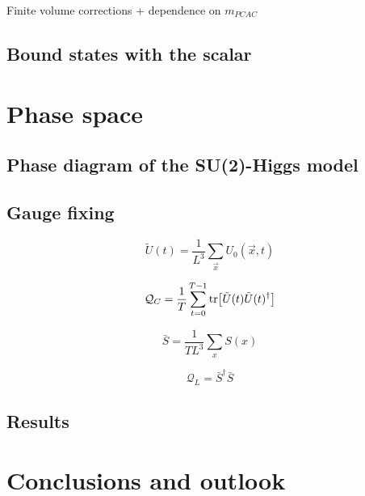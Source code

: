 Finite volume corrections + dependence on $m_{PCAC}$

\subsection{Bound states with the scalar}




\section{Phase space}

\subsection{Phase diagram of the SU(2)-Higgs model}

\subsection{Gauge fixing}

\begin{equation}
\tilde U(t) = \frac{1}{L^3} \sum_{\vec x} U_{0}(\vec x,t)
\end{equation}

\begin{equation}
\mathcal Q_C = \frac{1}{T} \sum_{t=0}^{T-1} \tr [\tilde U(t) \tilde U(t)^{\dagger}]
\end{equation}

\begin{equation}
\bar S = \frac{1}{TL^3} \sum_{x} S(x)
\end{equation}

\begin{equation}
\mathcal Q_L = \bar S^{\dagger} \bar S
\end{equation}

\subsection{Results}


\section{Conclusions and outlook}


